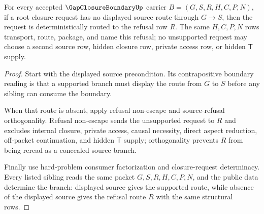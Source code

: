 \begin{theorem}
\label{thm:gap-closure-boundary-refusal-route-determinacy}
For every accepted $\GapClosureBoundaryUp$ carrier $B=(G,S,R,H,C,P,N)$, if a root closure request has no displayed source route through $G \longrightarrow S$, then the request is deterministically routed to the refusal row $R$. The same $H,C,P,N$ rows transport, route, package, and name this refusal; no unsupported request may choose a second source row, hidden closure row, private access row, or hidden $\mathsf{T}$ supply.
\end{theorem}
\begin{proof}
Start with the displayed source precondition. Its contrapositive boundary reading is that a supported branch must display the route from $G$ to $S$ before any sibling can consume the boundary.

When that route is absent, apply refusal non-escape and source-refusal orthogonality. Refusal non-escape sends the unsupported request to $R$ and excludes internal closure, private access, causal necessity, direct aspect reduction, off-packet continuation, and hidden $\mathsf{T}$ supply; orthogonality prevents $R$ from being reread as a concealed source branch.

Finally use hard-problem consumer factorization and closure-request determinacy. Every listed sibling reads the same packet $G,S,R,H,C,P,N$, and the public data determine the branch: displayed source gives the supported route, while absence of the displayed source gives the refusal route $R$ with the same structural rows.
\end{proof}

